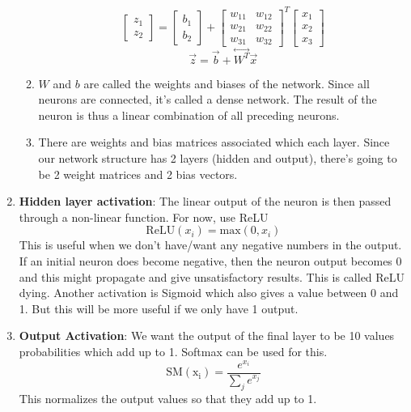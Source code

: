 \documentclass{article}
\begin{document}
\begin{enumerate}
\begin{enumerate}
\begin{center}
    
    \end{center}

    \begin{equation*}
        \begin{bmatrix}
            z_1\\z_2
        \end{bmatrix} = 
        \begin{bmatrix}
            b_{1}\\b_{2}
        \end{bmatrix} +
                \begin{bmatrix}
            w_{11} & w_{12}\\
            w_{21} & w_{22}\\
            w_{31} & w_{32}
        \end{bmatrix}^T
        \begin{bmatrix}
            x_1 \\ x_2 \\ x_3
        \end{bmatrix}
    \end{equation*}
    \[\vec{z} = \vec{b}+\overset{\leftrightarrow}{W^T}\vec{x}\]
    
    \item $W$ and $b$ are called the weights and biases of the network. Since all neurons are connected, it's called a dense network. The result of the neuron is thus a linear combination of all preceding neurons. 
    \item There are weights and bias matrices associated which each layer. Since our network structure has 2 layers (hidden and output), there's going to be 2 weight matrices and 2 bias vectors.

    \end{enumerate}
    
    \item \textbf{Hidden layer activation}: The linear output of the neuron is then passed through a non-linear function. For now, use ReLU
    \[\mathrm{ReLU}(x_i) = \mathrm{max}(0,x_i)\]
    This is useful when we don't have/want any negative numbers in the output. If an initial neuron does become negative, then the neuron output becomes 0 and this might propagate and give unsatisfactory results. This is called ReLU dying. Another activation is Sigmoid which also gives a value between 0 and 1. But this will be more useful if we only have 1 output.
    \item \textbf{Output Activation}: We want the output of the final layer to be 10 values probabilities which add up to 1. Softmax can be used for this. 
    \[\mathrm{SM(x_i)} = \frac{e^{x_i}}{\sum_j e^{x_j}}\]
    This normalizes the output values so that they add up to 1. 
    
\end{enumerate}
\end{document}
